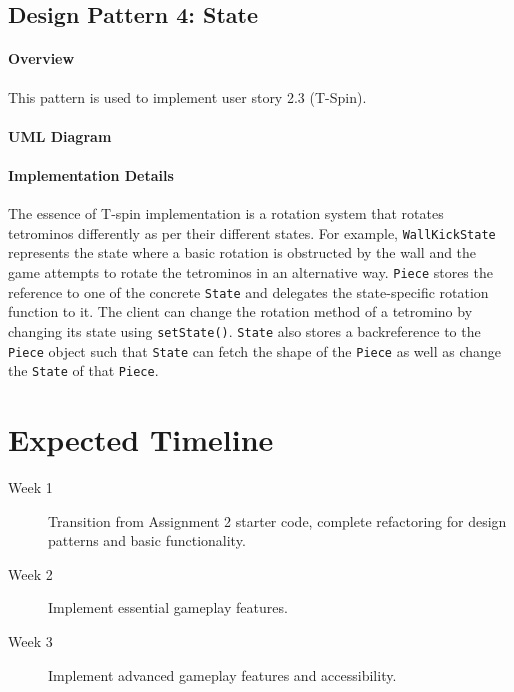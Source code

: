 \documentclass{article}
\begin{document}
\clearpage

\subsection{Design Pattern 4: State}

\paragraph{Overview}
This pattern is used to implement user story 2.3 (T-Spin).

\paragraph{UML Diagram}\hfill

\begin{figure}[H]
    
\end{figure}

\paragraph{Implementation Details}

The essence of T-spin implementation is a rotation system that rotates tetrominos differently as per their different states. For example, \verb`WallKickState` represents the state where a basic rotation is obstructed by the wall and the game attempts to rotate the tetrominos in an alternative way. \verb`Piece` stores the reference to one of the concrete \verb`State` and delegates the state-specific rotation function to it. The client can change the rotation method of a tetromino by changing its state using \verb`setState()`. \verb`State` also stores a backreference to the \verb`Piece` object such that \verb`State` can fetch the shape of the \verb`Piece` as well as change the \verb`State` of that \verb`Piece`.

\clearpage

\section{Expected Timeline}

\begin{description}
\item[Week 1] Transition from Assignment 2 starter code, complete refactoring for design patterns and basic functionality.
\item[Week 2] Implement essential gameplay features.
\item[Week 3] Implement advanced gameplay features and accessibility.
\end{description}
\end{document}
